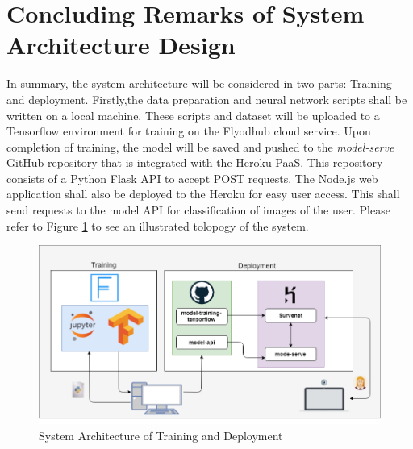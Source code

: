 \section{Concluding Remarks of System Architecture Design}
In summary, the system architecture will be considered in two parts: Training and deployment. Firstly,the data preparation and neural network scripts shall be written on a local machine. These scripts and dataset will be uploaded to a Tensorflow environment for training on the Flyodhub cloud service. Upon completion of training, the model will be saved and pushed to the \textit{model-serve} GitHub repository that is integrated with the Heroku PaaS. This repository consists of a Python Flask API to accept POST requests. The Node.js web application shall also be deployed to the Heroku for easy user access. This shall send requests to the model API for classification of images of the user.
Please refer to Figure \ref{arch} to see an illustrated tolopogy of the system.

\begin{figure}[ht]
	\begin{center}
		\advance\leftskip-3cm
		\advance\rightskip-3cm
		\includegraphics[keepaspectratio=true,scale=0.6]{__resources/arch.png}
		\caption{System Architecture of Training and Deployment}
		\label{arch}
	\end{center}
\end{figure}

